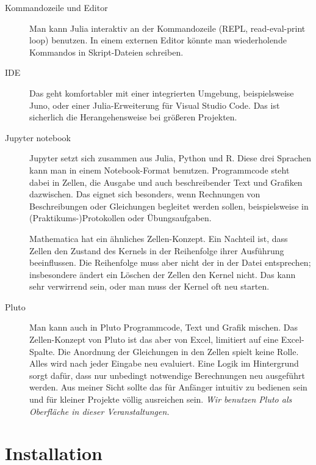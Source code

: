 \begin{description}
\item[Kommandozeile und Editor] Man kann Julia interaktiv an der Kommandozeile (REPL, read-eval-print loop) benutzen. In einem externen Editor  könnte man wiederholende Kommandos in Skript-Dateien schreiben.

\item[IDE] Das geht komfortabler mit einer integrierten Umgebung, beispielsweise Juno, oder einer Julia-Erweiterung 
für Visual Studio Code. Das ist sicherlich die Herangehensweise bei  größeren Projekten.

\item[Jupyter notebook] Jupyter setzt sich zusammen aus Julia, Python und R. Diese drei Sprachen kann man in einem Notebook-Format benutzen. Programmcode steht dabei in Zellen, die Ausgabe und auch beschreibender Text und Grafiken dazwischen. Das eignet sich besonders, wenn Rechnungen von Beschreibungen oder Gleichungen begleitet werden sollen, beispielsweise in (Praktikums-)Protokollen oder Übungsaufgaben. 

Mathematica hat ein ähnliches Zellen-Konzept. Ein Nachteil ist, dass Zellen den Zustand des Kernels in der Reihenfolge ihrer Ausführung beeinflussen. Die Reihenfolge muss aber nicht der in der Datei entsprechen; insbesondere ändert ein Löschen der Zellen den Kernel nicht. Das kann sehr verwirrend sein, oder man muss der Kernel oft neu starten.

\item[Pluto]  Man kann auch in Pluto Programmcode, Text und Grafik mischen. Das Zellen-Konzept von Pluto ist das aber von Excel, limitiert auf eine Excel-Spalte. Die Anordnung der Gleichungen in den Zellen spielt keine Rolle. Alles wird nach jeder Eingabe neu evaluiert. Eine Logik im Hintergrund sorgt dafür, dass nur unbedingt notwendige Berechnungen neu ausgeführt werden. Aus meiner Sicht sollte das für Anfänger intuitiv zu bedienen sein und für kleiner Projekte völlig ausreichen sein. \emph{Wir benutzen Pluto als Oberfläche in dieser Veranstaltungen.}

\end{description}



\section{Installation}


